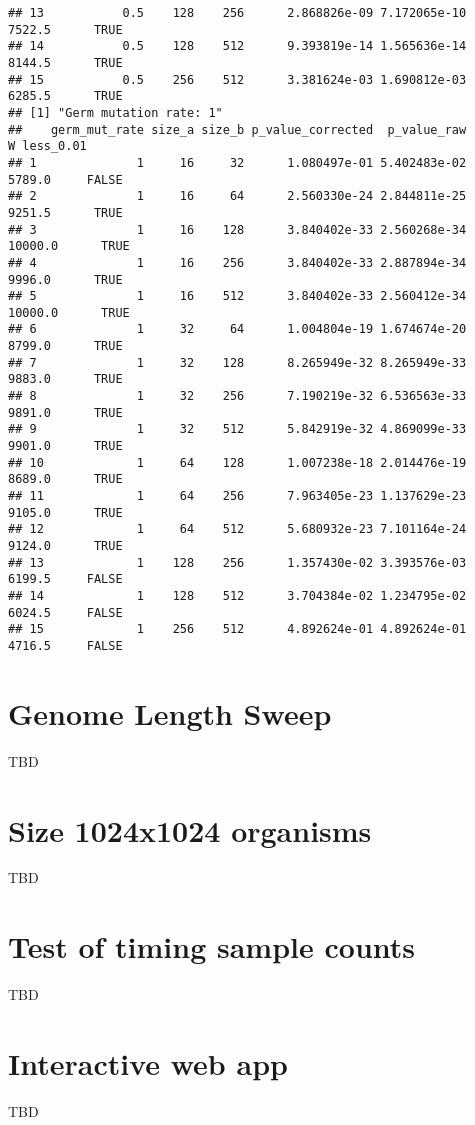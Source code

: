 \documentclass[]{book}
\begin{document}
\begin{verbatim}
## 13           0.5    128    256      2.868826e-09 7.172065e-10  7522.5      TRUE
## 14           0.5    128    512      9.393819e-14 1.565636e-14  8144.5      TRUE
## 15           0.5    256    512      3.381624e-03 1.690812e-03  6285.5      TRUE
## [1] "Germ mutation rate: 1"
##    germ_mut_rate size_a size_b p_value_corrected  p_value_raw       W less_0.01
## 1              1     16     32      1.080497e-01 5.402483e-02  5789.0     FALSE
## 2              1     16     64      2.560330e-24 2.844811e-25  9251.5      TRUE
## 3              1     16    128      3.840402e-33 2.560268e-34 10000.0      TRUE
## 4              1     16    256      3.840402e-33 2.887894e-34  9996.0      TRUE
## 5              1     16    512      3.840402e-33 2.560412e-34 10000.0      TRUE
## 6              1     32     64      1.004804e-19 1.674674e-20  8799.0      TRUE
## 7              1     32    128      8.265949e-32 8.265949e-33  9883.0      TRUE
## 8              1     32    256      7.190219e-32 6.536563e-33  9891.0      TRUE
## 9              1     32    512      5.842919e-32 4.869099e-33  9901.0      TRUE
## 10             1     64    128      1.007238e-18 2.014476e-19  8689.0      TRUE
## 11             1     64    256      7.963405e-23 1.137629e-23  9105.0      TRUE
## 12             1     64    512      5.680932e-23 7.101164e-24  9124.0      TRUE
## 13             1    128    256      1.357430e-02 3.393576e-03  6199.5     FALSE
## 14             1    128    512      3.704384e-02 1.234795e-02  6024.5     FALSE
## 15             1    256    512      4.892624e-01 4.892624e-01  4716.5     FALSE
\end{verbatim}

\hypertarget{genome-length-sweep}{%
\chapter{Genome Length Sweep}\label{genome-length-sweep}}

TBD

\hypertarget{size-1024x1024-organisms}{%
\chapter{Size 1024x1024 organisms}\label{size-1024x1024-organisms}}

TBD

\hypertarget{test-of-timing-sample-counts}{%
\chapter{Test of timing sample counts}\label{test-of-timing-sample-counts}}

TBD

\hypertarget{interactive-web-app}{%
\chapter{Interactive web app}\label{interactive-web-app}}

TBD
\end{document}
